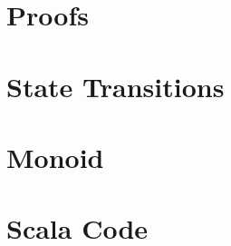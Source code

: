 \documentclass[10pt,a4paper]{article}
\begin{document}


\appendix
\pagebreak
\section{Proofs}


\pagebreak
\section{State Transitions}


\section{Monoid}


\pagebreak
\section{Scala Code}


\clearpage

\end{document}
